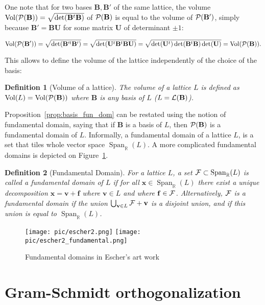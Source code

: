 \documentclass[12pt]{article}
\renewcommand{\vec}{\mathbf}
\newcommand{\R}{\mathbb R}
\newcommand{\Span}{\ensuremath{\operatorname{Span}}}
\newtheorem{definition}{Definition}{\bfseries}{\upshape}
\newcommand{\Vol}{\operatorname{Vol}}
\begin{document}
One note that for two bases $\vec B, \vec B'$ of the same lattice, the volume 
$\Vol(\cP(\vec B)) = \sqrt{\det(\vec B^t \vec B)} $ of $\cP(\vec B)$ is equal to the volume of $\cP(\vec B')$, simply because $\vec B' = \vec B \vec U$ for some matrix $\vec U$ of determinant $\pm 1$:

\[\Vol(\cP(\vec B')) = \sqrt{\det(\vec B'^t \vec B')} = \sqrt{\det(\vec U^t \vec B^t \vec B \vec U)} = \sqrt{\det(\vec U^t) \det(\vec B^t \vec B) \det(\vec U)} = \Vol(\cP(\vec B)). \]


This allows to define the volume of the lattice independently of the choice of the basis:

\begin{definition}[Volume of a lattice]
The volume of a lattice $L$ is defined as $\Vol(L) = \Vol(\cP(\vec B))$ where $\vec B$ is any basis of $L$ ($L = \cL(\vec B)$).
\end{definition}

Proposition~\ref{prop:basis_fun_dom} can be restated using the notion of fundamental domain, saying that if $\vec B$ is a basis of $L$,
then $\cP(\vec B)$ is a fundamental domain of $L$. Informally, a fundamental domain of a lattice $L$, is a set
that tiles whole vector space $\Span_\R(L)$. A more complicated fundamental domains is depicted on Figure~\ref{fig:escher}.

\begin{definition}[Fundamental Domain]
\label{def:fundamental_domain}
For a lattice $L$, a set $\cF \subset \Span_\R(L)$ is called a fundamental domain of $L$ if for all $\vec x \in \Span_\R(L)$ there exist a unique decomposition $\vec x = \vec v + \vec f$ where $\vec v \in L$ and where $\vec f \in \cF$.
Alternatively, $\mathcal{F}$ is a fundamental domain if the union $\bigcup_{\vec v \in L} \cF + \vec v$ is a disjoint union, and if this union is equal to $\Span_\R(L)$.
\end{definition}

\begin{figure} 
 \caption{Fundamental domains in Escher's art work}     
 \label{fig:escher}
\centering
{\texttt{[image: pic/escher2.png]}} \quad
{\texttt{[image: pic/escher2\_fundamental.png]}}
\end{figure}


\section{Gram-Schmidt orthogonalization}
\end{document}
